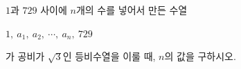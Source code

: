 $1$과 $729$ 사이에 $n$개의 수를 넣어서 만든 수열\par\smallskip\noindent\hspace*{1.5em}$1,\ a_1,\ a_2,\ \cdots,\ a_n,\ 729$\par\smallskip\noindent 가 공비가 $\sqrt{3}$인 등비수열을 이룰 때, $n$의 값을 구하시오.
